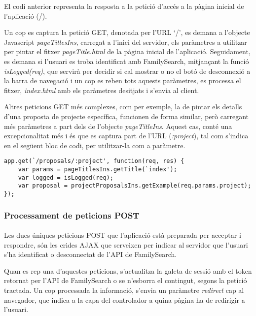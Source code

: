     El codi anterior representa la resposta a la petició d'accés a la pàgina inicial de l'aplicació (/).

    Un cop es captura la petició GET, denotada per l'URL `/',  es demana a l'objecte Javascript \emph{pageTitlesIns}, carregat a l'inici del servidor, els paràmetres a utilitzar per pintar el fitxer \emph{pageTitle.html} de la pàgina inicial de l'aplicació. Seguidament, es demana si l’usuari es troba identificat amb FamilySearch, mitjançant la funció \emph{isLogged(req)}, que servirà per decidir si cal mostrar o no el botó de desconnexió a la barra de navegació i un cop es reben tots aquests paràmetres, es processa el fitxer, \emph{index.html} amb els paràmetres desitjats i s'envia al client.

    Altres peticions GET més complexes, com per exemple, la de pintar els detalls d'una proposta de projecte específica, funcionen de forma similar, però carregant més paràmetres a part dels de l'objecte \emph{pageTitleIns}. Aquest cas, conté una ex\-cep\-cio\-na\-li\-tat més i és que es captura part de l'URL (\emph{:project}), tal com s'indica en el següent bloc de codi, per utilitzar-la com a paràmetre.

    \begin{lstlisting}[style=rawOwn,caption={Exemple d'utilització com a paràmetre, d'una part de l'URL}]
app.get(`/proposals/:project', function(req, res) {
    var params = pageTitlesIns.getTitle(`index');
    var logged = isLogged(req);
    var proposal = projectProposalsIns.getExample(req.params.project);
});
    \end{lstlisting}


    \subsubsection{Processament de peticions POST}

    \paragraph{}
    Les dues úniques peticions POST que l'aplicació està preparada per acceptar i respondre, són les crides AJAX que serveixen per indicar al servidor que l'usuari s'ha identificat o desconnectat de l'API de FamilySearch.

    Quan es rep una d'aquestes peticions, s'actualitza la galeta de sessió amb el token retornat per l'API de FamilySearch o se n'esborra el contingut, segons la petició tractada. Un cop processada la informació, s'envia un paràmetre \emph{redirect} cap al navegador, que indica a la capa del controlador a quina pàgina ha de redirigir a l'usuari.


